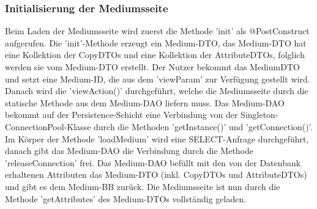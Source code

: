 \documentclass{article}
\begin{document}
\subsubsection{Initialisierung der Mediumsseite}
Beim Laden der Mediumsseite wird zuerst die Methode 'init' als @PostConstruct aufgerufen. Die 'init'-Methode erzeugt ein Medium-DTO, das Medium-DTO hat eine Kollektion der CopyDTOs und eine Kollektion der AttributeDTOs, folglich werden sie vom Medium-DTO erstellt. Der Nutzer bekommt das MediumDTO und setzt eine Medium-ID, die aus dem 'viewParam' zur Verfügung gestellt wird. Danach wird die 'viewAction()' durchgeführt, welche die Mediumsseite durch die statische Methode aus dem Medium-DAO liefern muss. Das Medium-DAO bekommt auf der Persistence-Schicht eine Verbindung von der Singleton-ConnectionPool-Klasse durch die Methoden 'getInstance()' und 'getConnection()'. Im Körper der Methode 'loadMedium' wird eine SELECT-Anfrage durchgeführt, danach gibt das Medium-DAO die Verbindung durch die Methode 'releaseConnection' frei. Das Medium-DAO befüllt mit den von der Datenbank erhaltenen Attributen das Medium-DTO (inkl. CopyDTOs und AttributeDTOs) und gibt es dem Medium-BB zurück. Die Mediumsseite ist nun durch die Methode 'getAttributes' des Medium-DTOs vollständig geladen.
\end{document}
